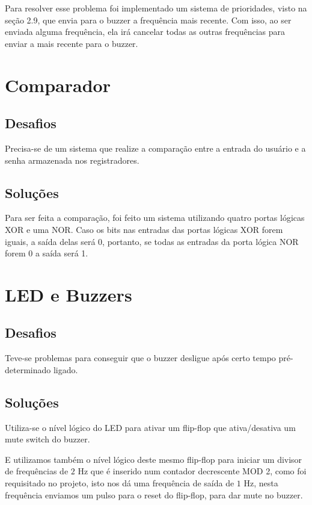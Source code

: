Para resolver esse problema foi implementado um sistema de prioridades, visto na seção 2.9, que envia para o buzzer a frequência mais recente. Com isso, ao ser enviada alguma frequência, ela irá cancelar todas as outras frequências para enviar a mais recente para o buzzer.

\section{Comparador}

\subsection{Desafios}

Precisa-se de um sistema que realize a comparação entre a entrada do usuário e a senha armazenada nos registradores.

\subsection{Soluções}

Para ser feita a comparação, foi feito um sistema utilizando quatro portas lógicas XOR e uma NOR. Caso os bits nas entradas das portas lógicas XOR forem iguais, a saída delas será 0, portanto, se todas as entradas da porta lógica NOR forem 0 a saída será 1.

\section{LED e Buzzers}

\subsection{Desafios}

Teve-se problemas para conseguir que o buzzer desligue após certo tempo pré-determinado ligado.

\subsection{Soluções}

Utiliza-se o nível lógico do LED para ativar um flip-flop que ativa/desativa um mute switch do buzzer.

E utilizamos também o nível lógico deste mesmo flip-flop para iniciar um divisor de frequências de $2$ Hz que é inserido num contador decrescente MOD 2, como foi requisitado no projeto, isto nos dá uma frequência de saída de $1$ Hz, nesta frequência enviamos um pulso para o reset do flip-flop, para dar mute no buzzer.

